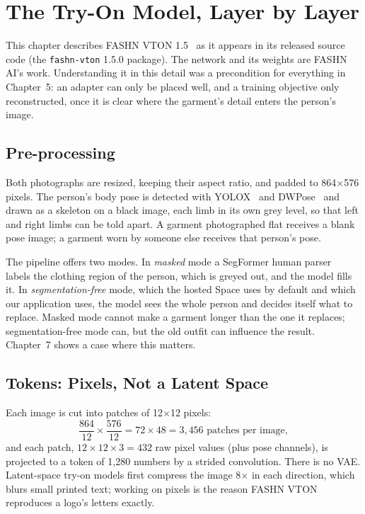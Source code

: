 \chapter{The Try-On Model, Layer by Layer}

This chapter describes FASHN VTON 1.5~\cite{fashn} as it appears in its released source code (the \texttt{fashn-vton} 1.5.0 package). The network and its weights are FASHN AI's work. Understanding it in this detail was a precondition for everything in Chapter~5: an adapter can only be placed well, and a training objective only reconstructed, once it is clear where the garment's detail enters the person's image.

\section{Pre-processing}

Both photographs are resized, keeping their aspect ratio, and padded to 864$\times$576 pixels. The person's body pose is detected with YOLOX~\cite{yolox} and DWPose~\cite{dwpose} and drawn as a skeleton on a black image, each limb in its own grey level, so that left and right limbs can be told apart. A garment photographed flat receives a blank pose image; a garment worn by someone else receives that person's pose.

The pipeline offers two modes. In \emph{masked} mode a SegFormer human parser~\cite{segformer} labels the clothing region of the person, which is greyed out, and the model fills it. In \emph{segmentation-free} mode, which the hosted Space uses by default and which our application uses, the model sees the whole person and decides itself what to replace. Masked mode cannot make a garment longer than the one it replaces; segmentation-free mode can, but the old outfit can influence the result. Chapter~7 shows a case where this matters.

\section{Tokens: Pixels, Not a Latent Space}

Each image is cut into patches of 12$\times$12 pixels:
\begin{equation}
\frac{864}{12} \times \frac{576}{12} = 72 \times 48 = 3{,}456 \text{ patches per image},
\end{equation}
and each patch, $12 \times 12 \times 3 = 432$ raw pixel values (plus pose channels), is projected to a token of 1{,}280 numbers by a strided convolution. There is no VAE. Latent-space try-on models first compress the image 8$\times$ in each direction, which blurs small printed text; working on pixels is the reason FASHN VTON reproduces a logo's letters exactly.

